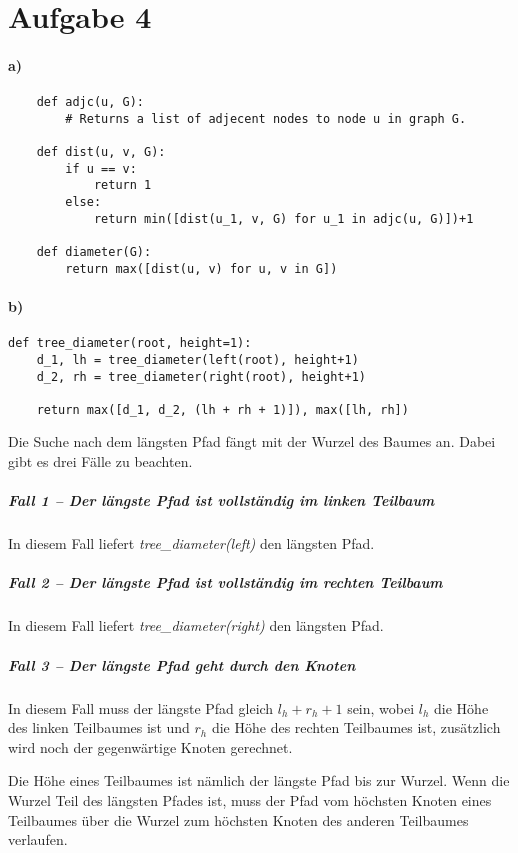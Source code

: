 \documentclass[a4paper,10pt]{scrartcl}
\begin{document}
\section*{Aufgabe 4}

\paragraph{a)}

\begin{verbatim}
    def adjc(u, G):
        # Returns a list of adjecent nodes to node u in graph G.

    def dist(u, v, G):
        if u == v:
            return 1
        else:
            return min([dist(u_1, v, G) for u_1 in adjc(u, G)])+1

    def diameter(G):
        return max([dist(u, v) for u, v in G])
\end{verbatim}

\paragraph{b)}

\begin{verbatim}
def tree_diameter(root, height=1):
    d_1, lh = tree_diameter(left(root), height+1)
    d_2, rh = tree_diameter(right(root), height+1)

    return max([d_1, d_2, (lh + rh + 1)]), max([lh, rh])
\end{verbatim}

Die Suche nach dem längsten Pfad fängt mit der Wurzel des Baumes an.
Dabei gibt es drei Fälle zu beachten.

\subparagraph{Fall 1 -- Der längste Pfad ist vollständig im linken Teilbaum}

In diesem Fall liefert \emph{tree\_diameter(left)} den längsten Pfad.

\subparagraph{Fall 2 -- Der längste Pfad ist vollständig im rechten Teilbaum}

In diesem Fall liefert \emph{tree\_diameter(right)} den längsten Pfad.

\subparagraph{Fall 3 -- Der längste Pfad geht durch den Knoten}

In diesem Fall muss der längste Pfad gleich $l_h + r_h + 1$ sein, wobei $l_h$ die Höhe des linken
Teilbaumes ist und $r_h$ die Höhe des rechten Teilbaumes ist, zusätzlich wird noch der gegenwärtige
Knoten gerechnet.

Die Höhe eines Teilbaumes ist nämlich der längste Pfad bis zur Wurzel.
Wenn die Wurzel Teil des längsten Pfades ist, muss der Pfad vom höchsten Knoten eines Teilbaumes über die Wurzel
zum höchsten Knoten des anderen Teilbaumes verlaufen.
\end{document}
